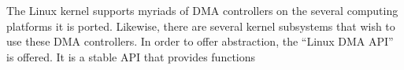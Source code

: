 The Linux kernel supports myriads of DMA controllers on the several computing platforms it is ported.
Likewise, there are several kernel subsystems that wish to use these DMA controllers.
In order to offer abstraction, the ``Linux DMA API'' is offered. It is a stable API that provides
functions 







